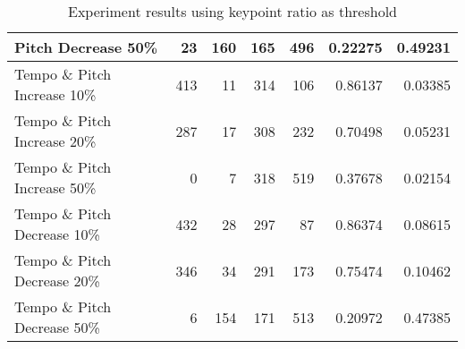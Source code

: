 \begin{table}[H]
\begin{tabular}{|l|r|r|r|r|r|r|}
        Pitch Decrease 50\%                & 23          & 160         & 165         & 496         & 0.22275           & 0.49231          \\ \hline
        Tempo  \& Pitch Increase 10\%      & 413         & 11          & 314         & 106         & 0.86137           & 0.03385          \\ \hline
        Tempo  \& Pitch Increase 20\% & 287         & 17          & 308         & 232         & 0.70498           & 0.05231          \\ \hline
        Tempo  \& Pitch Increase 50\% & 0           & 7           & 318         & 519         & 0.37678           & 0.02154          \\ \hline
        Tempo  \& Pitch Decrease 10\% & 432         & 28          & 297         & 87          & 0.86374           & 0.08615          \\ \hline
        Tempo  \& Pitch Decrease 20\% & 346         & 34          & 291         & 173         & 0.75474           & 0.10462          \\ \hline
        Tempo  \& Pitch Decrease 50\% & 6           & 154         & 171         & 513         & 0.20972           & 0.47385          \\ \hline
    \end{tabular}

\caption{Experiment results using keypoint ratio as threshold}
\label{tab:test_results_keypoint_ratio}
\end{table}
